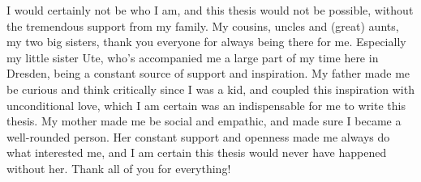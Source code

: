 I would certainly not be who I am, and this thesis would not be possible, without the tremendous support from my family. 
My cousins, uncles and (great) aunts, my two big sisters, thank you everyone for always being there for me. 
Especially my little sister Ute, who's accompanied me a large part of my time here in Dresden, being a constant source of support and inspiration.
My father made me be curious and think critically since I was a kid, and coupled this inspiration with unconditional love, which I am certain was an indispensable for me to write this thesis.
My mother made me be social and empathic, and made sure I became a well-rounded person.
Her constant support and openness made me always do what interested me, and I am certain this thesis would never have happened without her.
Thank all of you for everything!
